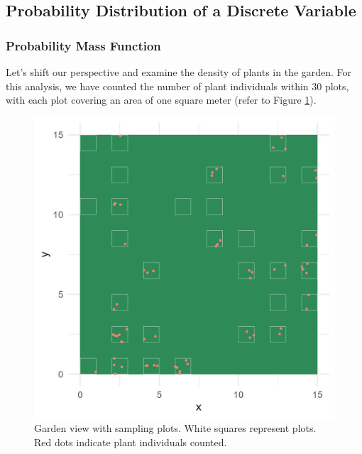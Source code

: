 \documentclass[
]{article}
\begin{document}
\hypertarget{probability-distribution-of-a-discrete-variable}{%
\subsection{Probability Distribution of a Discrete Variable}\label{probability-distribution-of-a-discrete-variable}}

\hypertarget{probability-mass-function}{%
\subsubsection{Probability Mass Function}\label{probability-mass-function}}

Let's shift our perspective and examine the density of plants in the garden. For this analysis, we have counted the number of plant individuals within 30 plots, with each plot covering an area of one square meter (refer to Figure \ref{fig:garden}).

\begin{figure}

{\centering \includegraphics[width=16.67in]{image/figure_garden} 

}

\caption{Garden view with sampling plots. White squares represent plots. Red dots indicate plant individuals counted.}\label{fig:garden}
\end{figure}
\end{document}
